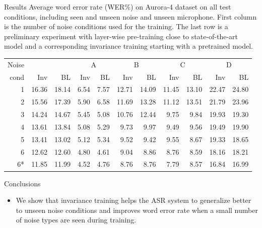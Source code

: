 \documentclass[final]{beamer}
\newlength{\onecolwid}
\begin{document}
\begin{frame}[t]
\begin{columns}[t]
\begin{column}{\onecolwid}
\begin{block}{Results}
    Average word error rate (WER\%) on Aurora-4 dataset on all test conditions,
        including seen and unseen noise and unseen microphone. First column
        is the number of noise conditions used for the training. The last row is a 
        preliminary experiment with layer-wise pre-training close to state-of-the-art
        model and a corresponding invariance training starting with a pretrained model.
\begin{table}
    \centering
    \label{tab:results}
    \begin{tabular}{r|rr||rr|rr|rr|rr}
        Noise       &&&  \multicolumn{2}{c|}{A} & \multicolumn{2}{c|}{B} & \multicolumn{2}{c|}{C} & \multicolumn{2}{c}{D}\\
        cond  & Inv & BL &  Inv & BL & Inv & BL & Inv & BL & Inv & BL\\
    \hline
    1           &\textcolor{dblue}{16.36}        &18.14 & 6.54  & 7.57    &12.71& 14.09   & 11.45&   13.10    & 22.47 &   24.80    \\
        2           &\textcolor{dblue}{15.56}        &17.39 & 5.90  & 6.58    &   11.69   &13.28   &11.12   &13.51   &21.79   &23.96 \\
        3           &\textcolor{dblue}{14.24}        &14.67 & 5.45  & 5.08    &   10.76&   12.44&   9.75&    9.84 &   19.93&   19.30\\
        4           &\textcolor{dblue}{13.61}        &13.84 & 5.08  & 5.29    &9.73    &9.97    &9.49    &9.56    &19.49   &19.90\\         
        5           &13.41        &\textcolor{dblue}{13.02} & 5.12  & 5.34    &9.52    &9.42    &9.55    &8.67    &19.33   &18.65\\         
        6           &12.62        &\textcolor{dblue}{12.60} & 4.80  & 4.61    &9.04    &8.86    &8.76    &8.59    &18.16   &18.21\\
    \hline\hline
    6*          &\textcolor{dblue}{11.85}        &11.99 &4.52    &4.76    &8.76    &8.76    &7.79    &8.57    &16.84&    16.99
    \end{tabular}
\end{table}
\end{block}

\begin{block}{Conclusions}
    \begin{itemize}
        \item We show that invariance training helps the ASR system to generalize better to unseen noise 
            conditions and improves word error rate when a small number of noise types are seen during 
            training. 


\end{itemize}
\end{block}
\end{column}
\end{columns}
\end{frame}
\end{document}

